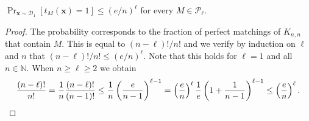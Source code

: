 \documentclass[10pt,a4paper]{amsart}
\def\cald{{\mathcal D}}
\def\calp{{\mathcal P}}
\begin{document}
\begin{claim}
    \label{claim:match}
    $\Pr_{\bm x\sim\cald_1}[t_M(\bm x)=1] \leq (e/n)^\ell$ for every $M \in \calp_\ell$.
\end{claim}

\begin{proof}
The probability corresponds to the fraction of perfect matchings of $K_{n,n}$ that contain $M$. This is equal to $(n-\ell)!/n!$ and we verify by induction on $\ell$ and $n$ that $(n-\ell)!/n! \leq (e/n)^\ell$.
    Note that this holds for $\ell = 1$ and all
    $n \in \mathbb{N}$.
    When $n \geq \ell \geq 2$ we obtain
    \begin{equation*}
        \frac{(n-\ell)!}{n!}
        =
        \frac{1}{n}
        \frac{(n-\ell)!}{(n-1)!}
        \leq
        \frac{1}{n}
        \left(
            \frac{e}{n-1}
        \right)^{\ell-1}
        =
        \left( \frac{e}{n} \right)^{\ell}
        \frac{1}{e}
        \left( 1 + \frac{1}{n-1} \right)^{\ell-1}
        \leq
        \left( \frac{e}{n} \right)^{\ell}.
        \qedhere
\end{equation*}
\end{proof}
\end{document}
